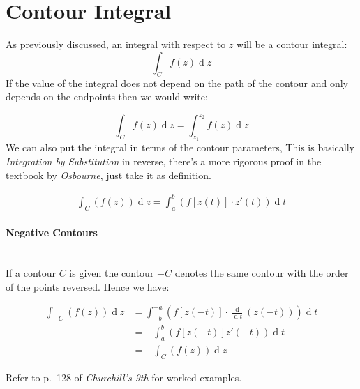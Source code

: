 \documentclass[class=article, crop=false]{standalone}
\begin{document}
\hypertarget{contour-integral}{%
\section{Contour Integral}\label{contour-integral}}

As previously discussed, an integral with respect to \(z\) will be a
contour integral: \[\int^{}_{C} f \left(z \right)   \operatorname{d}z\]
If the value of the integral does not depend on the path of the contour
and only depends on the endpoints then we would write:

\[\int^{}_{C} f \left(z \right)   \operatorname{d}z = \int^{z_2}_{z_1} f\left( z   \right) \operatorname{d}z\]
We can also put the integral in terms of the contour parameters, This is
basically \emph{Integration by Substitution} in reverse, there's a more
rigorous proof in the textbook by \emph{Osbourne}, just take it as
definition.

\[\begin{aligned}
    \int^{}_{C}\left( f\left( z \right)  \right) \operatorname{d}z = \int^{b}_{a}\left(f \left[ z\left( t \right)  \right]\cdot  z'\left( t \right)  \right) \operatorname{d}t  
    \label{tdef}
  \end{aligned}\]

\hypertarget{negative-contours}{%
\paragraph{Negative Contours}\label{negative-contours}}

~\\
If a contour \(C\) is given the contour \(- C\) denotes the same contour
with the order of the points reversed. Hence we have:

\[\begin{aligned}
     \int^{}_{-C}\left( f\left( z \right)  \right) \operatorname{d}z  &= \int^{- a}_{- b}\left( f\left[ z\left( - t \right)  \right] \cdot \frac{\operatorname{d} }{\operatorname{d} t}\left( z\left( - t \right)  \right)  \right) \operatorname{d}t \\
    &= - \int^{b}_{a}\left( f\left[ z\left( - t \right)  \right] z'\left( - t \right)  \right) \operatorname{d}t \\
    &= - \int^{}_{C}\left( f\left( z \right)  \right) \operatorname{d}z \end{aligned}\]

Refer to p.~128 of \emph{Churchill's 9th} for worked examples.
\end{document}

